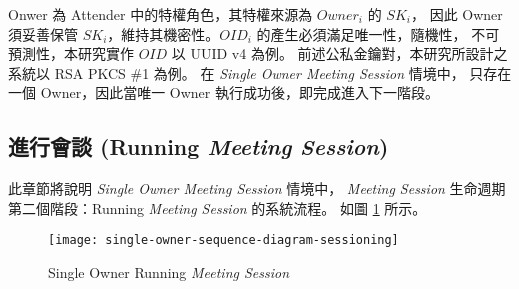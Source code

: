 \begin{steps}
            Onwer 為 Attender 中的特權角色，其特權來源為 $Owner_{i}$ 的 $SK_{i}$，
        因此 Owner 須妥善保管 $SK_{i}$，維持其機密性。$OID_{i}$ 的產生必須滿足唯一性，隨機性，
        不可預測性，本研究實作 $OID$ 以 UUID v4 為例。
        前述公私金鑰對，本研究所設計之系統以 RSA PKCS \#1 為例。
        在 {\it Single Owner Meeting Session} 情境中，
        只存在一個 Owner，因此當唯一 Owner 執行成功後，即完成進入下一階段。
\end{steps}

\subsection{進行會談 (Running {\it Meeting Session})}

    此章節將說明 {\it Single Owner Meeting Session} 情境中，
{\it Meeting Session} 生命週期第二個階段：Running {\it Meeting Session} 的系統流程。
如圖 \ref{fig.s-o-sessioning} 所示。

\begin{figure}[H]
    \centering
    \texttt{[image: single-owner-sequence-diagram-sessioning]}
    \caption{Single Owner Running {\it Meeting Session}}
    \label{fig.s-o-sessioning}
\end{figure}

